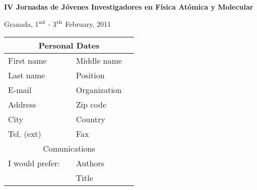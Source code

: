 \documentclass [12pt,a4paper] {letter}
\begin{document}
\pagestyle{empty}

\begin{center}
{\bf
{\Large
IV Jornadas de Jóvenes Investigadores en Física Atómica y Molecular
}

{\large
Granada, 1$^{\rm nd}$ - 3$^{\rm th}$ February, 2011
}
}

\begin{tabular}{llll}
\hline
\multicolumn{4}{c}{Personal Dates} \\
\hline
First name		&		&Middle name		&	\\
Last name		&		&Position		&	\\
E-mail	                &		&Organization		&	\\
Address                 &		&Zip code               &       \\
City                    &		&Country                &       \\
Tel. (ext)              &		&Fax                    &       \\
\hline
\multicolumn{4}{c}{Comunications} \\
\hline
I would prefer:         &               &Authors                &	\\
                        &               &Title                  &	\\
\hline
\end{tabular}                                                    	
\end{center}
                                                                         
\end{document}
